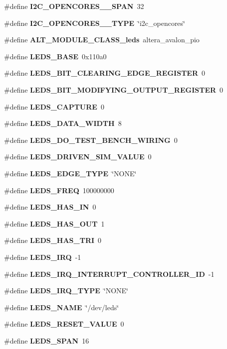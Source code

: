 \begin{DoxyCompactItemize}
\item 
\#define {\bf I2\+C\+\_\+\+O\+P\+E\+N\+C\+O\+R\+E\+S\+\_\+\_\+\+S\+P\+AN}~32
\item 
\#define {\bf I2\+C\+\_\+\+O\+P\+E\+N\+C\+O\+R\+E\+S\+\_\+\_\+\+T\+Y\+PE}~\char`\"{}i2c\+\_\+opencores\char`\"{}
\item 
\#define {\bf A\+L\+T\+\_\+\+M\+O\+D\+U\+L\+E\+\_\+\+C\+L\+A\+S\+S\+\_\+leds}~altera\+\_\+avalon\+\_\+pio
\item 
\#define {\bf L\+E\+D\+S\+\_\+\+B\+A\+SE}~0x110a0
\item 
\#define {\bf L\+E\+D\+S\+\_\+\+B\+I\+T\+\_\+\+C\+L\+E\+A\+R\+I\+N\+G\+\_\+\+E\+D\+G\+E\+\_\+\+R\+E\+G\+I\+S\+T\+ER}~0
\item 
\#define {\bf L\+E\+D\+S\+\_\+\+B\+I\+T\+\_\+\+M\+O\+D\+I\+F\+Y\+I\+N\+G\+\_\+\+O\+U\+T\+P\+U\+T\+\_\+\+R\+E\+G\+I\+S\+T\+ER}~0
\item 
\#define {\bf L\+E\+D\+S\+\_\+\+C\+A\+P\+T\+U\+RE}~0
\item 
\#define {\bf L\+E\+D\+S\+\_\+\+D\+A\+T\+A\+\_\+\+W\+I\+D\+TH}~8
\item 
\#define {\bf L\+E\+D\+S\+\_\+\+D\+O\+\_\+\+T\+E\+S\+T\+\_\+\+B\+E\+N\+C\+H\+\_\+\+W\+I\+R\+I\+NG}~0
\item 
\#define {\bf L\+E\+D\+S\+\_\+\+D\+R\+I\+V\+E\+N\+\_\+\+S\+I\+M\+\_\+\+V\+A\+L\+UE}~0
\item 
\#define {\bf L\+E\+D\+S\+\_\+\+E\+D\+G\+E\+\_\+\+T\+Y\+PE}~\char`\"{}N\+O\+NE\char`\"{}
\item 
\#define {\bf L\+E\+D\+S\+\_\+\+F\+R\+EQ}~100000000
\item 
\#define {\bf L\+E\+D\+S\+\_\+\+H\+A\+S\+\_\+\+IN}~0
\item 
\#define {\bf L\+E\+D\+S\+\_\+\+H\+A\+S\+\_\+\+O\+UT}~1
\item 
\#define {\bf L\+E\+D\+S\+\_\+\+H\+A\+S\+\_\+\+T\+RI}~0
\item 
\#define {\bf L\+E\+D\+S\+\_\+\+I\+RQ}~-\/1
\item 
\#define {\bf L\+E\+D\+S\+\_\+\+I\+R\+Q\+\_\+\+I\+N\+T\+E\+R\+R\+U\+P\+T\+\_\+\+C\+O\+N\+T\+R\+O\+L\+L\+E\+R\+\_\+\+ID}~-\/1
\item 
\#define {\bf L\+E\+D\+S\+\_\+\+I\+R\+Q\+\_\+\+T\+Y\+PE}~\char`\"{}N\+O\+NE\char`\"{}
\item 
\#define {\bf L\+E\+D\+S\+\_\+\+N\+A\+ME}~\char`\"{}/dev/leds\char`\"{}
\item 
\#define {\bf L\+E\+D\+S\+\_\+\+R\+E\+S\+E\+T\+\_\+\+V\+A\+L\+UE}~0
\item 
\#define {\bf L\+E\+D\+S\+\_\+\+S\+P\+AN}~16

\end{DoxyCompactItemize}
